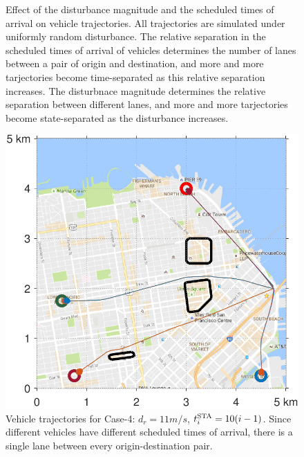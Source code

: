 \begin{figure}[!htb]
\begin{subfigure}{0.5\textwidth}
  \label{fig:sf_d11sep5}
\end{subfigure}%
\caption{Effect of the disturbance magnitude and the scheduled times of arrival on vehicle trajectories. All trajectories are simulated under uniformly random disturbance. The relative separation in the scheduled times of arrival of vehicles determines the number of lanes between a pair of origin and destination, and more and more tarjectories become time-separated as this relative separation increases. The disturbnace magnitude determines the relative separation between different lanes, and more and more tarjectories become state-separated as the disturbance increases. }
\label{fig:trajectories_sf}
\end{figure}

\begin{figure}[t]
  \centering
  \includegraphics[width=\columnwidth]{"figs/sf_d11sep10"}
  \caption{Vehicle trajectories for Case-4: $d_r = 11m/s$, $t^\text{STA}_i = 10(i-1)$. Since different vehicles have different scheduled times of arrival, there is a single lane between every origin-destination pair.} 
  \label{fig:sf_d11sep10}
\end{figure}